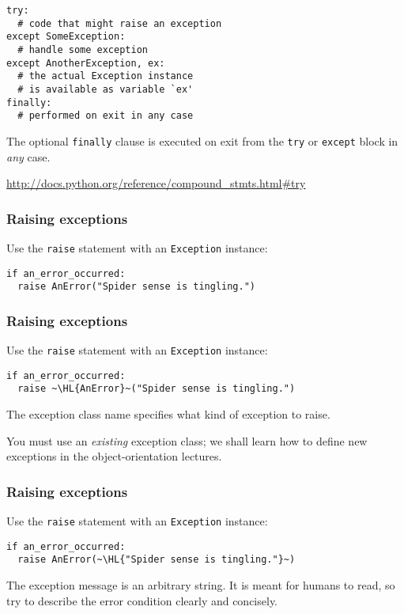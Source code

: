 \documentclass[english,serif,mathserif,xcolor=pdftex,dvipsnames,table]{beamer}
\begin{document}
\begin{frame}[fragile]
\begin{lstlisting}
try:
  # code that might raise an exception
except SomeException:
  # handle some exception
except AnotherException, ex:
  # the actual Exception instance
  # is available as variable `ex'
finally:
  # performed on exit in any case
\end{lstlisting}

  \+
  The optional \lstinline|finally| clause is executed on exit from the
  \lstinline|try| or \lstinline|except| block in \emph{any} case.

  \begin{references}
    \scriptsize
    \url{http://docs.python.org/reference/compound_stmts.html#try}
\end{references}
\end{frame}


\begin{frame}[fragile]
  \frametitle{Raising exceptions}
  Use the \lstinline|raise| statement with an \texttt{Exception}
  instance:
\begin{lstlisting}
if an_error_occurred:
  raise AnError("Spider sense is tingling.")
\end{lstlisting}
\end{frame}


\begin{frame}[fragile]
  \frametitle{Raising exceptions}

  Use the \lstinline|raise| statement with an \texttt{Exception}
  instance:
\begin{lstlisting}
if an_error_occurred:
  raise ~\HL{AnError}~("Spider sense is tingling.")
\end{lstlisting}

  \+
  The exception class name specifies what kind of exception to raise.

  \+
  You must use an \emph{existing} exception class; we shall learn
  how to define new exceptions in the object-orientation lectures.
\end{frame}


\begin{frame}[fragile]
  \frametitle{Raising exceptions}

  Use the \lstinline|raise| statement with an \texttt{Exception}
  instance:
\begin{lstlisting}
if an_error_occurred:
  raise AnError(~\HL{"Spider sense is tingling."}~)
\end{lstlisting}

  \+
  The exception message is an arbitrary string.  It is meant for
  humans to read, so try to describe the error condition clearly and
  concisely.
\end{frame}
\end{document}

